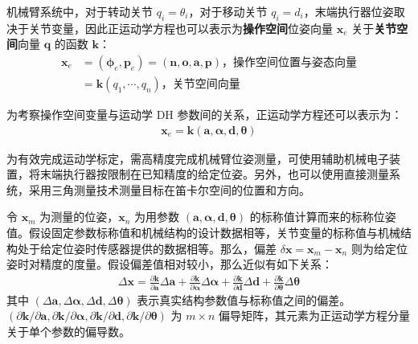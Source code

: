 \documentclass[cn,11pt,chinese,blue,bibstyle=ieeetr]{elegantbook}
\begin{document}
机械臂系统中，对于转动关节 $q_i=\theta_i$，对于移动关节 $q_i=d_i$，末端执行器位姿取决于关节变量，因此正运动学方程也可以表示为\textbf{操作空间}位姿向量 $\bm{x}_e$ 关于\textbf{关节空间}向量 $\bm{q}$ 的函数 $\bm{k}$：
\begin{equation}
\begin{aligned}
	\bm{x}_e &= \left(\bm{\phi}_e , \bm{p}_e\right) = \left(\bm{n} , \bm{o} , \bm{a} , \bm{p}\right)\text{，操作空间位置与姿态向量} \\
	&=\bm{k} \left(q_1 , \cdots , q_n\right) \text{，关节空间向量}
\end{aligned}
\end{equation}

为考察操作空间变量与运动学 DH 参数间的关系，正运动学方程还可以表示为：
\begin{equation}
	\begin{aligned}
		\bm{x}_e =\bm{k} \left(\bm{a},\bm{\alpha},\bm{d},\bm{\theta}\right)
	\end{aligned}
\end{equation}

为有效完成运动学标定，需高精度完成机械臂位姿测量，可使用辅助机械电子装置，将末端执行器按限制在已知精度的给定位姿。另外，也可以使用直接测量系统，采用三角测量技术测量目标在笛卡尔空间的位置和方向。

令 $\bm{x}_m$ 为测量的位姿，$\bm{x}_n$ 为用参数 $\left(\bm{a},\bm{\alpha},\bm{d},\bm{\theta}\right)$ 的标称值计算而来的标称位姿值。假设固定参数标称值和机械结构的设计数据相等，关节变量的标称值与机械结构处于给定位姿时传感器提供的数据相等。那么，偏差 $\delta \bm{x} = \bm{x}_m - \bm{x}_n$ 则为给定位姿时对精度的度量。假设偏差值相对较小，那么近似有如下关系：
\begin{equation}
	\begin{aligned}
	\Delta\bm{x} = \frac{\partial\bm{k}}{\partial\bm{a}} \Delta\bm{a} + \frac{\partial\bm{k}}{\partial\bm{\alpha}} \Delta\bm{\alpha} + \frac{\partial\bm{k}}{\partial\bm{d}} \Delta\bm{d} + \frac{\partial\bm{k}}{\partial\bm{\theta}} \Delta\bm{\theta}
\end{aligned}
\end{equation}
其中 $\left(\Delta\bm{a},\Delta\bm{\alpha},\Delta\bm{d},\Delta\bm{\theta}\right)$ 表示真实结构参数值与标称值之间的偏差。$\left({\partial\bm{k}}/{\partial\bm{a}},{\partial\bm{k}}/{\partial\bm{\alpha}},{\partial\bm{k}}/{\partial\bm{d}},{\partial\bm{k}}/{\partial\bm{\theta}}\right)$ 为 $ m \times n$ 偏导矩阵，其元素为正运动学方程分量关于单个参数的偏导数。
\end{document}
